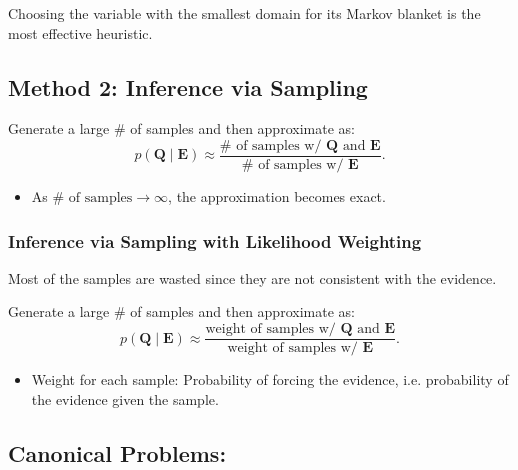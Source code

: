 \begin{warning}
    Choosing the variable with the smallest domain for its Markov blanket is the most effective heuristic.
\end{warning}
\newpage

\subsection{Method 2: Inference via Sampling}
\begin{definition}
    Generate a large \# of samples and then approximate as:
    \[
    p(\mathbf{Q} \mid \mathbf{E}) \approx \frac{\# \text{ of samples w/ } \mathbf{Q} \text{ and } \mathbf{E}}{\# \text{ of samples w/ } \mathbf{E}}.
    \]
    \begin{itemize}
        \item As $\# \text{ of samples} \to \infty$, the approximation becomes exact.
    \end{itemize}
\end{definition}

\subsubsection{Inference via Sampling with Likelihood Weighting}
\begin{motivation}
    Most of the samples are wasted since they are not consistent with the evidence.
\end{motivation}

\begin{definition}
    Generate a large \# of samples and then approximate as:
    \[
    p(\mathbf{Q} \mid \mathbf{E}) \approx \frac{\text{weight of samples w/ } \mathbf{Q} \text{ and } \mathbf{E}}{\text{weight of samples w/ } \mathbf{E}}.
    \]
    \begin{itemize}
        \item Weight for each sample: Probability of forcing the evidence, i.e. probability of the evidence given the sample.
    \end{itemize}
\end{definition}
\newpage

\subsection{Canonical Problems:}

